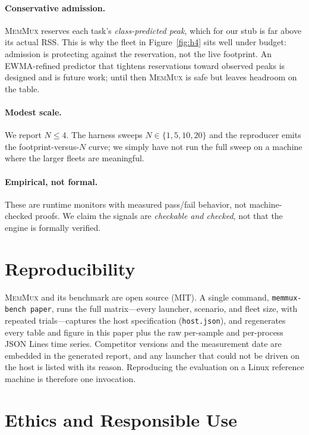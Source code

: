 \documentclass[11pt]{article}
\newcommand{\sys}{\textsc{MemMux}}
\newcommand{\code}[1]{\texttt{#1}}
\begin{document}
\paragraph{Conservative admission.} \sys{} reserves each task's \emph{class-predicted peak}, which
for our stub is far above its actual RSS. This is why the fleet in Figure~\ref{fig:h4} sits well
under budget: admission is protecting against the reservation, not the live footprint. An
EWMA-refined predictor that tightens reservations toward observed peaks is designed and is future
work; until then \sys{} is safe but leaves headroom on the table.

\paragraph{Modest scale.} We report $N \leq 4$. The harness sweeps $N \in \{1,5,10,20\}$ and the
reproducer emits the footprint-versus-$N$ curve; we simply have not run the full sweep on a machine
where the larger fleets are meaningful.

\paragraph{Empirical, not formal.} These are runtime monitors with measured pass/fail behavior, not
machine-checked proofs. We claim the signals are \emph{checkable and checked}, not that the engine is
formally verified.

\section{Reproducibility}
\label{sec:repro}

\sys{} and its benchmark are open source (MIT). A single command,
\code{memmux-bench paper}, runs the full matrix---every launcher, scenario, and fleet size, with
repeated trials---captures the host specification (\code{host.json}), and regenerates every table and
figure in this paper plus the raw per-sample and per-process JSON Lines time series. Competitor
versions and the measurement date are embedded in the generated report, and any launcher that could
not be driven on the host is listed with its reason. Reproducing the evaluation on a Linux reference
machine is therefore one invocation.

\section{Ethics and Responsible Use}
\end{document}
